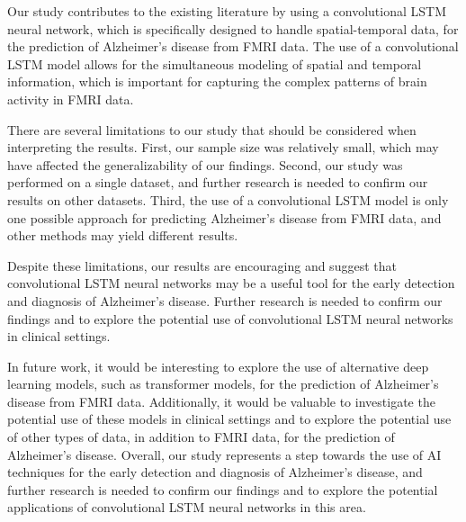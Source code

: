 \documentclass[10pt]{article}
\begin{document}
	Our study contributes to the existing literature by using a convolutional LSTM neural network, which is specifically designed to handle spatial-temporal data, for the prediction of Alzheimer's disease from FMRI data. The use of a convolutional LSTM model allows for the simultaneous modeling of spatial and temporal information, which is important for capturing the complex patterns of brain activity in FMRI data.

	There are several limitations to our study that should be considered when interpreting the results. First, our sample size was relatively small, which may have affected the generalizability of our findings. Second, our study was performed on a single dataset, and further research is needed to confirm our results on other datasets. Third, the use of a convolutional LSTM model is only one possible approach for predicting Alzheimer's disease from FMRI data, and other methods may yield different results.

	Despite these limitations, our results are encouraging and suggest that convolutional LSTM neural networks may be a useful tool for the early detection and diagnosis of Alzheimer's disease. Further research is needed to confirm our findings and to explore the potential use of convolutional LSTM neural networks in clinical settings.

	In future work, it would be interesting to explore the use of alternative deep learning models, such as transformer models, for the prediction of Alzheimer's disease from FMRI data. Additionally, it would be valuable to investigate the potential use of these models in clinical settings and to explore the potential use of other types of data, in addition to FMRI data, for the prediction of Alzheimer's disease. Overall, our study represents a step towards the use of AI techniques for the early detection and diagnosis of Alzheimer's disease, and further research is needed to confirm our findings and to explore the potential applications of convolutional LSTM neural networks in this area.

    
	
	
\end{document}
